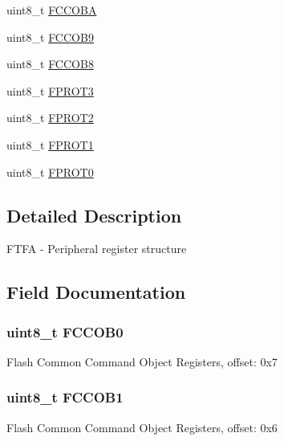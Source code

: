\begin{DoxyCompactItemize}
\item 
uint8\+\_\+t \hyperlink{struct_f_t_f_a___mem_map_aee01b0413a1bb74026a460da212a6f6d}{F\+C\+C\+O\+B\+A}
\item 
uint8\+\_\+t \hyperlink{struct_f_t_f_a___mem_map_ad4b7a9c387599f74d604a12eab7b3f8d}{F\+C\+C\+O\+B9}
\item 
uint8\+\_\+t \hyperlink{struct_f_t_f_a___mem_map_a098678952099a9d95ceb16bf591db8e4}{F\+C\+C\+O\+B8}
\item 
uint8\+\_\+t \hyperlink{struct_f_t_f_a___mem_map_a84a4810c0a2da0b5c5a6205e551e0bf6}{F\+P\+R\+O\+T3}
\item 
uint8\+\_\+t \hyperlink{struct_f_t_f_a___mem_map_adfb9669bc3184da7e4b49c320970b1df}{F\+P\+R\+O\+T2}
\item 
uint8\+\_\+t \hyperlink{struct_f_t_f_a___mem_map_a99308b5052058ad416c35ce9f82507f5}{F\+P\+R\+O\+T1}
\item 
uint8\+\_\+t \hyperlink{struct_f_t_f_a___mem_map_a36693d749fac8e3f218744ab5da5cda1}{F\+P\+R\+O\+T0}
\end{DoxyCompactItemize}


\subsection{Detailed Description}
F\+T\+F\+A -\/ Peripheral register structure 

\subsection{Field Documentation}
\hypertarget{struct_f_t_f_a___mem_map_a823ae05fb120635d89873f52f521120f}{}
\subsubsection[{F\+C\+C\+O\+B0}]{\setlength{\rightskip}{0pt plus 5cm}uint8\+\_\+t F\+C\+C\+O\+B0}\label{struct_f_t_f_a___mem_map_a823ae05fb120635d89873f52f521120f}
Flash Common Command Object Registers, offset\+: 0x7 \hypertarget{struct_f_t_f_a___mem_map_a263a6e9f6f0776df7d3bece9c50d65f0}{}
\subsubsection[{F\+C\+C\+O\+B1}]{\setlength{\rightskip}{0pt plus 5cm}uint8\+\_\+t F\+C\+C\+O\+B1}\label{struct_f_t_f_a___mem_map_a263a6e9f6f0776df7d3bece9c50d65f0}
Flash Common Command Object Registers, offset\+: 0x6 \hypertarget{struct_f_t_f_a___mem_map_aa5ad7d9940c2583b953391dfd3d2ba29}{}
